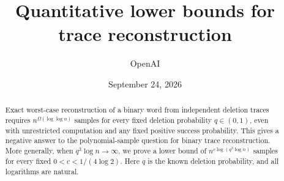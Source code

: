 \documentclass[11pt,letterpaper]{article}
\title{Quantitative lower bounds for trace reconstruction}
\author{OpenAI}
\date{September 24, 2026}
\begin{document}
\maketitle
\begin{abstract}
Exact worst-case reconstruction of a binary word from independent deletion traces requires $n^{\Omega(\log\log n)}$ samples for every fixed deletion probability $q\in(0,1)$, even with unrestricted computation and any fixed positive success probability. This gives a negative answer to the polynomial-sample question for binary trace reconstruction. More generally, when $q^3\log n\to\infty$, we prove a lower bound of $n^{c\log(q^3\log n)}$ samples for every fixed $0<c<1/(4\log2)$. Here $q$ is the known deletion probability, and all logarithms are natural.
\end{abstract}









\begingroup
\small
\raggedright

\endgroup
\end{document}
